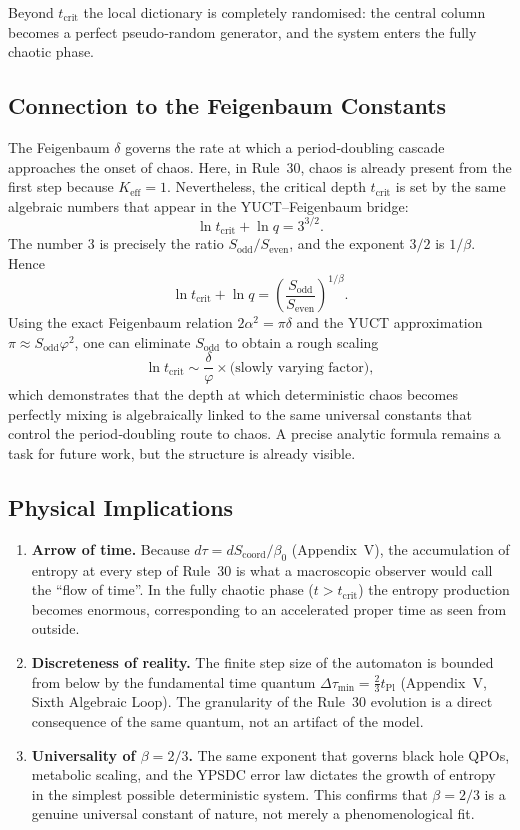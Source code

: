 \documentclass[12pt,a4paper]{article}
\begin{document}
{Beyond \(t_{\mathrm{crit}}\) the local dictionary is completely randomised:
the central column becomes a perfect pseudo‑random generator, and the system
enters the fully chaotic phase.

\subsection{Connection to the Feigenbaum Constants}
\label{subsec:feigenbaum-link}

The Feigenbaum \(\delta\) governs the rate at which a period‑doubling
cascade approaches the onset of chaos. Here, in Rule~30, chaos is already
present from the first step because \(K_{\mathrm{eff}}=1\). Nevertheless, the
critical depth \(t_{\mathrm{crit}}\) is set by the same algebraic numbers
that appear in the YUCT–Feigenbaum bridge:
\[
\ln t_{\mathrm{crit}} + \ln q = 3^{3/2}.
\]
The number \(3\) is precisely the ratio \(S_{\mathrm{odd}}/S_{\mathrm{even}}\),
and the exponent \(3/2\) is \(1/\beta\). Hence
\[
\ln t_{\mathrm{crit}} + \ln q =
\left(\frac{S_{\mathrm{odd}}}{S_{\mathrm{even}}}\right)^{\!1/\beta}.
\]
Using the exact Feigenbaum relation \(2\alpha^{2} = \pi\delta\) and the YUCT
approximation \(\pi \approx S_{\mathrm{odd}}\varphi^{2}\), one can eliminate
\(S_{\mathrm{odd}}\) to obtain a rough scaling
\[
\ln t_{\mathrm{crit}} \sim \frac{\delta}{\varphi} \times
\bigl(\text{slowly varying factor}\bigr),
\]
which demonstrates that the depth at which deterministic chaos becomes
perfectly mixing is algebraically linked to the same universal constants that
control the period‑doubling route to chaos. A precise analytic formula
remains a task for future work, but the structure is already visible.

\subsection{Physical Implications}
\label{subsec:implications}

\begin{enumerate}
	\item \textbf{Arrow of time.} Because \(d\tau = dS_{\mathrm{coord}}/\beta_{0}\)
	(Appendix~V), the accumulation of entropy at every step of Rule~30 is
	what a macroscopic observer would call the ``flow of time''. In the fully
	chaotic phase (\(t > t_{\mathrm{crit}}\)) the entropy production becomes
	enormous, corresponding to an accelerated proper time as seen from outside.
	\item \textbf{Discreteness of reality.} The finite step size of the
	automaton is bounded from below by the fundamental time quantum
	\(\Delta\tau_{\min} = \frac{2}{3}t_{\mathrm{Pl}}\) (Appendix~V,
	Sixth Algebraic Loop). The granularity of the Rule~30 evolution is a
	direct consequence of the same quantum, not an artifact of the model.
	\item \textbf{Universality of \(\beta=2/3\).} The same exponent that
	governs black hole QPOs, metabolic scaling, and the YPSDC error law
	dictates the growth of entropy in the simplest possible deterministic
	system. This confirms that \(\beta=2/3\) is a genuine universal constant
	of nature, not merely a phenomenological fit.
\end{enumerate}

}
\end{document}
